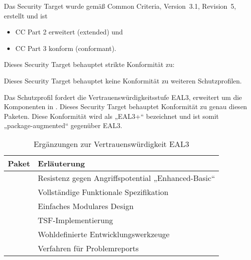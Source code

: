 

Das Security Target wurde gemäß Common Criteria, Version~3.1, Revision~5, erstellt und ist

\begin{itemize}
\item CC Part 2 \autocite{CCPart2} erweitert (extended) und
\item CC Part 3 \autocite{CCPart3} konform (conformant).
\end{itemize}


Dieses Security Target behauptet strikte Konformität zu:


\noindent{}Dieses Security Target behauptet keine Konformität zu weiteren Schutzprofilen.


Das Schutzprofil fordert die Vertrauenswürdigkeitsstufe EAL3, erweitert um die
Komponenten in . Dieses Security Target behauptet
Konformität zu genau diesen Paketen. Diese Konformität wird als „EAL3+“
bezeichnet und ist somit „package-augmented“ gegenüber EAL3.

\begin{table}[htbp]
  \centering
  \begin{tabularx}{0.7\textwidth}{@{}lY@{}}
    \toprule
    Paket & Erläuterung \\
    \midrule
     & Resistenz gegen Angriffspotential „Enhanced-Basic“\\
     & Vollständige Funktionale Spezifikation\\
     & Einfaches Modulares Design\\
     & TSF-Implementierung\\
     & Wohldefinierte Entwicklungswerkzeuge\\
     & Verfahren für Problemreports\\
    \bottomrule
  \end{tabularx}
  \caption{Ergänzungen zur Vertrauenswürdigkeit EAL3}
  \label{tab:conf.eal3plus}
\end{table}

